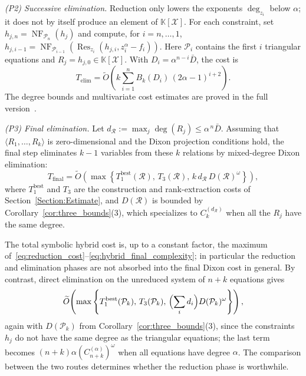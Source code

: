 \emph{(P2) Successive elimination.} Reduction only lowers the exponents $\deg_{z_i}$ below $\alpha$; it does not by itself produce an element of $\mathbb{K}[\mathcal{X}]$. For each constraint, set $h_{j,n}=\operatorname{NF}_{\mathcal{P}_n}(h_j)$ and compute, for $i=n,\ldots,1$, $h_{j,i-1}=\operatorname{NF}_{\mathcal{P}_{i-1}}(\operatorname{Res}_{z_i}(h_{j,i},z_i^\alpha-f_i))$. Here $\mathcal{P}_i$ contains the first $i$ triangular equations and $R_j=h_{j,0}\in\mathbb{K}[\mathcal{X}]$. With $D_i=\alpha^{n-i}\bar D$, the cost is
\begin{equation}
	T_{\text{elim}} = \widetilde{O}\!\left(k\sum_{i=1}^{n} B_k(D_i)\,(2\alpha-1)^{i+2}\right).
	\label{eq:successive_elim_cost}
\end{equation}
The degree bounds and multivariate cost estimates are proved in the full version~\cite{cryptoeprint:2026/1969}.

\emph{(P3) Final elimination.} Let $d_{\mathcal{R}} := \max_j \deg(R_j)\le \alpha^{\,n}\bar{D}$. Assuming that $\langle R_1,\ldots,R_k\rangle$ is zero-dimensional and the Dixon projection conditions hold, the final step eliminates $k-1$ variables from these $k$ relations by mixed-degree Dixon elimination:
\begin{equation}
	T_{\text{final}} = \widetilde{O}\!\left(\max\left\{T_{1}^{\mathrm{best}}(\mathcal{R}),\,T_3(\mathcal{R}),\,k\,d_{\mathcal{R}}\,D(\mathcal{R})^{\omega}\right\}\right),
	\label{eq:hybrid_final_complexity}
\end{equation}
where $T_{1}^{\mathrm{best}}$ and $T_3$ are the construction and rank-extraction costs of Section~\ref{Section:Estimate}, and $D(\mathcal{R})$ is bounded by Corollary~\ref{cor:three_bounds}(3), which specializes to $C_k^{(d_{\mathcal{R}})}$ when all the $R_j$ have the same degree.

The total symbolic hybrid cost is, up to a constant factor, the maximum of~\eqref{eq:reduction_cost}--\eqref{eq:hybrid_final_complexity}; in particular the reduction and elimination phases are not absorbed into the final Dixon cost in general. By contrast, direct elimination on the unreduced system of $n+k$ equations gives
\begin{equation}
	\widetilde{O}\!\left(\max\left\{T_{1}^{\mathrm{best}}(\mathcal{P}_k),\,T_3(\mathcal{P}_k),\,\Bigl(\sum_i d_i\Bigr)D(\mathcal{P}_k)^{\omega}\right\}\right),
	\label{eq:hybrid_direct_complexity}
\end{equation}
again with $D(\mathcal{P}_k)$ from Corollary~\ref{cor:three_bounds}(3), since the constraints $h_j$ do not have the same degree as the triangular equations; the last term becomes $(n+k)\alpha (C_{n+k}^{(\alpha)})^{\omega}$ when all equations have degree $\alpha$. The comparison between the two routes determines whether the reduction phase is worthwhile.


